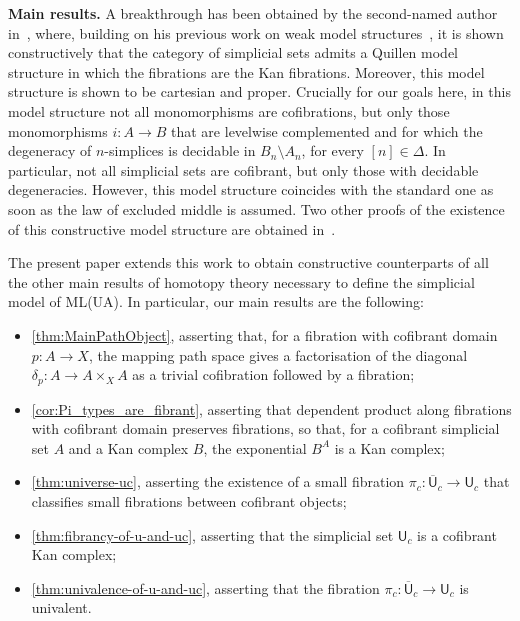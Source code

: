 \documentclass[reqno,10pt,a4paper,oneside]{amsart}
\numberwithin{equation}{section}
\theoremstyle{mythm}
\theoremstyle{mydef}
\theoremstyle{myrmk}
\newcommand{\co}{\colon}
\newcommand{\UU}{\overline{\mathsf{U}}}
\newcommand{\U}{\mathsf{U}}
\begin{document}
\noindent
\textbf{Main results.}
A breakthrough has been obtained  by the second-named author in~\cite{henry2019qms}, where, building on his previous work on weak model structures~\cite{henry2018wms},
it is shown constructively that the category of simplicial sets admits a Quillen model structure in which the
fibrations are the Kan fibrations. Moreover, this model structure is shown to be cartesian and proper.  Crucially for our goals here,  in this model structure not all monomorphisms are 
cofibrations, but only those monomorphisms $i \co A \to B$ that are levelwise complemented 
and for which the degeneracy of $n$-simplices is decidable in $B_n \setminus A_n$, for every $[n] \in \Delta$. In particular, not all simplicial sets are cofibrant, but only those with decidable degeneracies. However, this model structure coincides with
the standard one as soon as the law of excluded middle is assumed. Two other  
proofs of the  existence of this constructive
model structure are obtained in~\cite{GambinoN:anocp}. 



 The present paper extends this work to obtain constructive counterparts of all the other main results of 
homotopy theory necessary to define the simplicial model of ML(UA). In particular, our main results are the following:
\begin{itemize}
\item \cref{thm:MainPathObject}, asserting that, for a fibration with cofibrant domain $p \co A \to X$, the mapping path space 
gives a factorisation of the diagonal $\delta_p \co A \to A \times_X A$ as a trivial cofibration followed by a fibration;
\item \cref{cor:Pi_types_are_fibrant}, asserting that dependent product along fibrations with cofibrant
domain preserves fibrations,  so that, for a cofibrant simplicial set $A$ and a Kan complex $B$, the exponential $B^A$ is a Kan complex; 
\item \cref{thm:universe-uc}, asserting the existence of a small fibration $\pi_c \co
\UU_c \to \U_c$ that classifies small fibrations between cofibrant objects;
\item \cref{thm:fibrancy-of-u-and-uc}, asserting that the simplicial set $\U_c$ is a cofibrant Kan complex;
\item \cref{thm:univalence-of-u-and-uc}, asserting that the fibration $\pi_c  \co
\UU_c \to \U_c$ is univalent.
\end{itemize}
\end{document}

